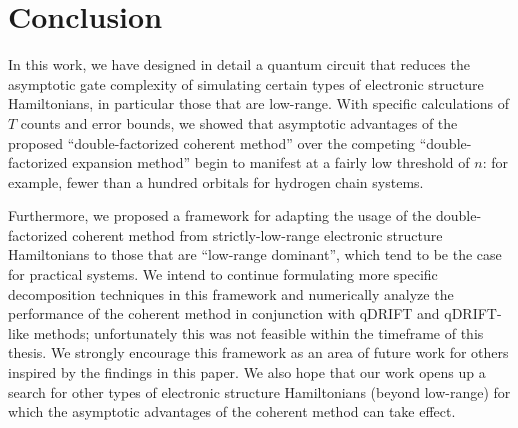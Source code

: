 

\chapter{Conclusion}

In this work, we have designed in detail a quantum circuit that reduces the asymptotic gate complexity of simulating certain types of electronic structure Hamiltonians, in particular those that are low-range. With specific calculations of $T$ counts and error bounds, we showed that asymptotic advantages of the proposed ``double-factorized coherent method'' over the competing ``double-factorized expansion method'' begin to manifest at a fairly low threshold of $n$: for example, fewer than a hundred orbitals for hydrogen chain systems.

Furthermore, we proposed a framework for adapting the usage of the double-factorized coherent method from strictly-low-range electronic structure Hamiltonians to those that are ``low-range dominant'', which tend to be the case for practical systems. We intend to continue formulating more specific decomposition techniques in this framework and numerically analyze the performance of the coherent method in conjunction with qDRIFT and qDRIFT-like methods; unfortunately this was not feasible within the timeframe of this thesis. We strongly encourage this framework as an area of future work for others inspired by the findings in this paper. We also hope that our work opens up a search for other types of electronic structure Hamiltonians (beyond low-range) for which the asymptotic advantages of the coherent method can take effect.


